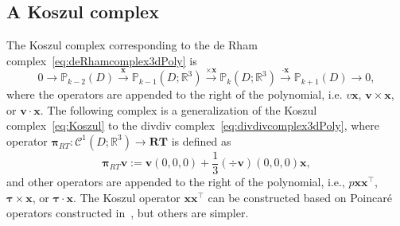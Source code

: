 \subsection{A Koszul complex}
The Koszul complex corresponding to the de Rham complex~\eqref{eq:deRhamcomplex3dPoly} is
\begin{equation}\label{eq:Koszul}
0
\xrightarrow{}
\mathbb P_{k-2}(D) 
\xrightarrow{\boldsymbol x}
\mathbb P_{k-1}(D;\mathbb R^3)
\xrightarrow{\times \boldsymbol  x}
\mathbb P_{k}(D;\mathbb R^3)
\xrightarrow{\cdot \boldsymbol  x} \mathbb P_{k+1}(D) \xrightarrow{} 0,
\end{equation}
where the operators are appended to the right of the polynomial, i.e. $v \boldsymbol x$, $\boldsymbol v\times \boldsymbol x $, or $\boldsymbol v\cdot \boldsymbol x$. 
The following complex is a generalization of the Koszul complex~\eqref{eq:Koszul} to the divdiv complex~\eqref{eq:divdivcomplex3dPoly}, where operator $\boldsymbol \pi_{RT}: \mathcal C^1(D; \mathbb R^3)\to \boldsymbol{RT}$ is defined as
\[
\boldsymbol \pi_{RT}\boldsymbol  v:=\boldsymbol  v(0,0,0)+\frac{1}{3}(\div\boldsymbol  v)(0,0,0)\boldsymbol  x,
\]
and other operators are appended to the right of the polynomial, i.e., $p \boldsymbol x\boldsymbol x^{\intercal}$, $\boldsymbol \tau\times \boldsymbol x $, or $\boldsymbol \tau\cdot \boldsymbol x$. The Koszul operator $\boldsymbol x\boldsymbol x^{\intercal}$ can be constructed based on Poincar\'e operators constructed in~\cite{ChristiansenHuSande2020}, but others are simpler. 

